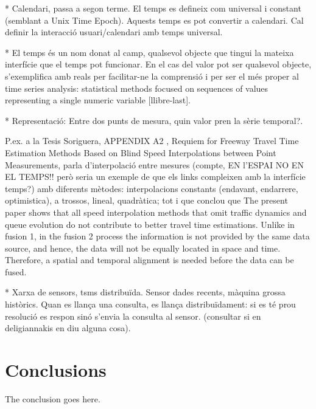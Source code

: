 \documentclass{acm_proc_article-sp}
\begin{document}
* Calendari, passa a segon terme. El temps es defineix com universal i constant (semblant a Unix Time Epoch). Aquests temps es pot convertir a calendari. Cal definir la interacció usuari/calendari amb temps universal.

* El temps és un nom donat al camp, qualsevol objecte que tingui la mateixa interfície que el temps pot funcionar. En el cas del valor pot ser qualsevol objecte, s'exemplifica amb reals per facilitar-ne la comprensió i per ser el més proper al time series analysis: statistical methods focused on sequences of values representing a single numeric variable [llibre-last].


* Representació: Entre dos punts de mesura, quin valor pren la sèrie temporal?.





 P.ex. a la Tesis Soriguera, APPENDIX A2 , 
Requiem for Freeway Travel Time Estimation Methods Based
on Blind Speed Interpolations between Point Measurements, parla d'interpolació entre mesures (compte, EN l'ESPAI NO EN EL TEMPS!! però seria un exemple de que els links compleixen amb la interfície temps?) amb diferents mètodes:  interpolacions constants (endavant, endarrere, optimistica), a trossos, lineal, quadràtica;    tot i que conclou que The present paper shows that all speed interpolation methods that omit traffic
dynamics and queue evolution do not contribute to better travel time estimations. 
Unlike in fusion 1, in the fusion 2 process the information is not provided by the same
data source, and hence, the data will not be equally located in space and time. 
Therefore, a spatial and temporal alignment is needed before the data can be fused.


* Xarxa de sensors, tsms distribuïda. Sensor dades recents, màquina grossa històrics. Quan es llança una consulta, es llança distribuïdament: si es té prou resolució es respon sinó s'envia la consulta al sensor. (consultar si en deligiannakis en diu alguna cosa).



\newpage

\mbox{}

\newpage





\section{Conclusions}
The conclusion goes here.
\end{document}
